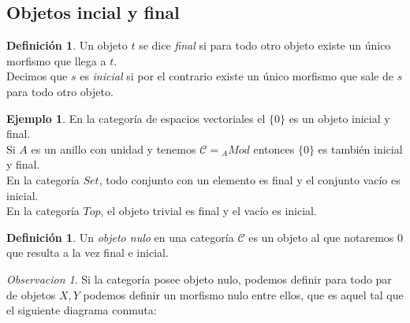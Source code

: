 \documentclass{article}
\newcommand{\conjunto}[1]{\ensuremath{\{#1\}}}
\theoremstyle{plain}
\theoremstyle{definition}
\newtheorem{definition}[theorem]{Definición}
\newtheorem{ejemplo}[theorem]{Ejemplo}
\theoremstyle{remark}
\newtheorem*{observacion}{Observacion}
\begin{document}
\subsection{Objetos incial y final}

\begin{definition}
    Un objeto $t$ se dice \textit{final} si para todo otro objeto existe un único morfismo que llega a $t$. \\

    Decimos que $s$ es \textit{inicial} si por el contrario existe un único morfismo que sale de $s$ para todo otro objeto.
\end{definition}

\begin{ejemplo}
    En la categoría de espacios vectoriales el $\conjunto{0}$ es un objeto inicial y final. \\

    Si $A$ es un anillo con unidad y tenemos $\mathcal{C} = {}_A Mod$ entonces $\conjunto{0}$ es también inicial y final. \\


    En la categoría $Set$, todo conjunto con un elemento es final y el conjunto vacío es inicial. \\

    En la categoría $Top$, el objeto trivial es final y el vacío es inicial.
\end{ejemplo}


\begin{definition}
    Un \textit{objeto nulo} en una categoría $\mathcal{C}$ es un objeto al que notaremos $0$ que resulta a la vez final e inicial.
\end{definition}

\begin{observacion}
    Si la categoría posee objeto nulo, podemos definir para todo par de objetos $X,Y$ podemos definir un morfismo nulo entre ellos, que es aquel tal que el siguiente diagrama conmuta:

    \begin{center}
    \end{center}

    
\end{observacion}
\end{document}
